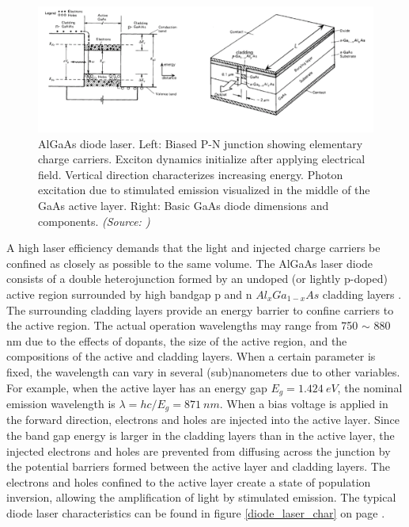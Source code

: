 \begin{figure} [ht]
\centering
\includegraphics[scale=0.5]{chapters/img/laser_diode_algaas.png}	
\caption{AlGaAs diode laser. Left: Biased P-N junction showing elementary charge carriers. Exciton dynamics initialize after applying electrical field. Vertical direction characterizes increasing energy. Photon excitation due to stimulated emission visualized in the middle of the GaAs active layer. Right: Basic GaAs diode dimensions and components. \emph{(Source: \cite{algaasdiodes})}}
\label{algaas_laser_configuration} 
\end{figure}

A high laser efficiency demands that the light and injected charge carriers be confined as closely as possible to the same volume. The AlGaAs laser diode consists of a double heterojunction formed by an undoped (or lightly p-doped) active region surrounded by high bandgap p and n $Al_{x}Ga_{1-x}As$ cladding layers \cite{algaasdiodes}. The surrounding cladding layers provide an energy barrier to confine carriers to the active region. The actual operation wavelengths may range from 750 $\sim$ 880 nm due to the effects of dopants, the size of the active region, and the compositions of the active and cladding layers. When a certain parameter is fixed, the wavelength can vary in several (sub)nanometers due to other variables. For example, when the active layer has an energy gap $E_{g} = 1.424\ eV$, the nominal emission wavelength is $\lambda = hc/E_{g}= 871\ nm$. When a bias voltage is applied in the forward direction, electrons and holes are injected into the active layer. Since the band gap energy is larger in the cladding layers than in the active layer, the injected electrons and holes are prevented from diffusing across the junction by the potential barriers formed between the active layer and cladding layers. The electrons and holes confined to the active layer create a state of population inversion, allowing the amplification of light by stimulated emission. The typical diode laser characteristics can be found in figure \ref{diode_laser_char} on page \pageref{diode_laser_char}.

